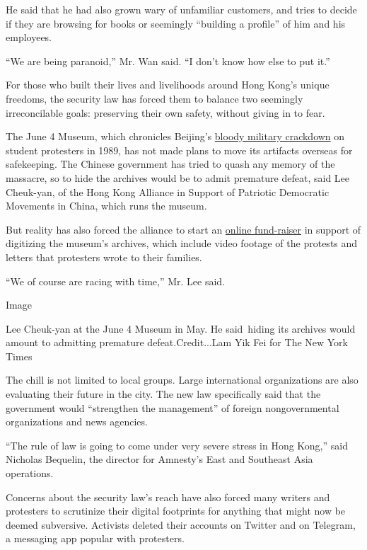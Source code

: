 He said that he had also grown wary of unfamiliar customers, and tries
to decide if they are browsing for books or seemingly ``building a
profile'' of him and his employees.

``We are being paranoid,'' Mr. Wan said. ``I don't know how else to put
it.''

For those who built their lives and livelihoods around Hong Kong's
unique freedoms, the security law has forced them to balance two
seemingly irreconcilable goals: preserving their own safety, without
giving in to fear.

The June 4 Museum, which chronicles Beijing's
\href{https://www.nytimes.com/2019/06/03/world/asia/tiananmen-massacre-anniversary-archive.html}{bloody
military crackdown} on student protesters in 1989, has not made plans to
move its artifacts overseas for safekeeping. The Chinese government has
tried to quash any memory of the massacre, so to hide the archives would
be to admit premature defeat, said Lee Cheuk-yan, of the Hong Kong
Alliance in Support of Patriotic Democratic Movements in China, which
runs the museum.

But reality has also forced the alliance to start an
\href{https://www.kickstarter.com/projects/64museum/june-4th-museum-of-memory-and-human-rights?ref=discovery\&term=\%E5\%85\%AD\%E5\%9B\%9B}{online
fund-raiser} in support of digitizing the museum's archives, which
include video footage of the protests and letters that protesters wrote
to their families.

``We of course are racing with time,'' Mr. Lee said.

Image

Lee Cheuk-yan at the June 4 Museum in May. He said~hiding its archives
would amount to admitting premature defeat.Credit...Lam Yik Fei for The
New York Times

The chill is not limited to local groups. Large international
organizations are also evaluating their future in the city. The new law
specifically said that the government would ``strengthen the
management'' of foreign nongovernmental organizations and news agencies.

``The rule of law is going to come under very severe stress in Hong
Kong,'' said Nicholas Bequelin, the director for Amnesty's East and
Southeast Asia operations.

Concerns about the security law's reach have also forced many writers
and protesters to scrutinize their digital footprints for anything that
might now be deemed subversive. Activists deleted their accounts on
Twitter and on Telegram, a messaging app popular with protesters.

